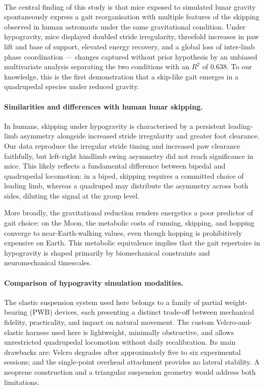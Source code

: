 \documentclass[blue]{enslyonstage}
\begin{document}
\paragraph{}
The central finding of this study is that mice exposed to simulated lunar
gravity spontaneously express a gait reorganisation with multiple features of
the skipping observed in human astronauts under the same gravitational
condition. Under hypogravity, mice displayed doubled stride irregularity,
threefold increases in paw lift and base of support, elevated energy recovery,
and a global loss of inter-limb phase coordination --- changes captured without
prior hypothesis by an unbiased multivariate analysis separating the two
conditions with an $R^2$ of 0.638. To our knowledge, this is the first
demonstration that a skip-like gait emerges in a quadrupedal species under
reduced gravity.

\paragraph{Similarities and differences with human lunar skipping.}
In humans, skipping under hypogravity is characterised by a persistent
leading-limb asymmetry alongside increased stride irregularity and greater foot
clearance\cite{minettiBiomechanicsSkippingGaits1998,paveiSkippingVsRunning2015}.
Our data reproduce the irregular stride timing and increased paw clearance
faithfully, but left-right hindlimb swing asymmetry did not reach significance
in mice. This likely reflects a fundamental difference between bipedal and
quadrupedal locomotion: in a biped, skipping requires a committed choice of
leading limb, whereas a quadruped may distribute the asymmetry across both
sides, diluting the signal at the group level.

More broadly, the gravitational reduction renders energetics a poor predictor
of gait choice: on the Moon, the metabolic costs of running, skipping, and
hopping converge to near-Earth-walking
values\cite{paveiSkippingVsRunning2015,paveiHoppingLocomotionDifferent2016},
even though hopping is prohibitively expensive on Earth. This metabolic
equivalence implies that the gait repertoire in hypogravity is shaped primarily
by biomechanical constraints and neuromechanical timescales.


\paragraph{Comparison of hypogravity simulation modalities.}
The elastic suspension system used here belongs to a family of partial
weight-bearing (PWB) devices, each presenting a distinct trade-off between
mechanical fidelity, practicality, and impact on natural
movement\cite{mortreuxApproachingGravityContinuum2020}. The custom
Velcro-and-elastic harness used here is lightweight, minimally obstructive,
and allows unrestricted quadrupedal locomotion without daily recalibration. Its
main drawbacks are: Velcro degrades after approximately five to six
experimental sessions; and the single-point overhead attachment provides no
lateral stability. A neoprene construction and a triangular suspension geometry
would address both limitations.
\end{document}
